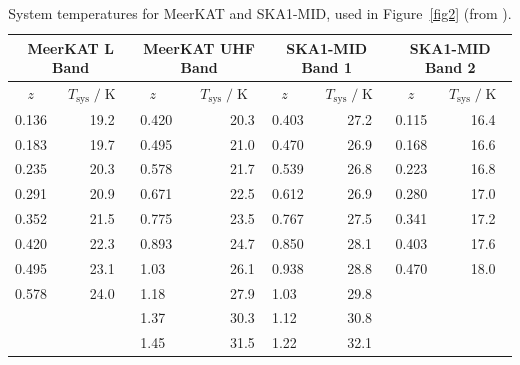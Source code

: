 \vspace*{-0.5cm}
\begin{table}[! ht]
\centering
\caption{\label{tab:skasystemp} System temperatures for MeerKAT and SKA1-MID, used in Figure~\ref{fig2} (from \cite{Fonseca:2019qek}).} 
\vspace*{0.2cm}
  \begin{tabular}{|l|l|l|l|l|l|l|l|}
    \hline
      \multicolumn{2}{|c|}{MeerKAT L Band} &
      \multicolumn{2}{c|}{MeerKAT UHF Band} &
      \multicolumn{2}{c|}{SKA1-MID Band 1} & 
      \multicolumn{2}{c|}{SKA1-MID Band 2} \\
      \hline \hline
    $~~~~z~~$ & $~~T_\mathrm{sys}\;/\;\mathrm{K}~~~$ & $~~~z~$ & $~~~~T_\mathrm{sys}\;/\;\mathrm{K}~~$ & $~~~z~$ & $~~T_\mathrm{sys}\;/\;\mathrm{K}~~$ & $~~~~z~~$ & $~~T_\mathrm{sys}\;/\;\mathrm{K}~~$ \\
    \hline
    
  
     0.136 & ~~~~19.2 & 0.420 & ~~~~~~20.3 & 0.403 & ~~~~27.2 & 0.115 & ~~~~16.4 \\
    
     0.183 & ~~~~19.7 & 0.495 & ~~~~~~21.0 & 0.470 & ~~~~26.9 & 0.168 & ~~~~16.6 \\
    
     0.235 & ~~~~20.3 & 0.578 & ~~~~~~21.7 & 0.539 & ~~~~26.8 & 0.223 & ~~~~16.8 \\
    
     0.291 & ~~~~20.9 & 0.671 & ~~~~~~22.5 & 0.612 & ~~~~26.9 & 0.280 & ~~~~17.0 \\
    
     0.352 & ~~~~21.5 & 0.775 & ~~~~~~23.5 & 0.767 & ~~~~27.5 & 0.341 & ~~~~17.2 \\
    
    0.420 & ~~~~22.3 & 0.893 & ~~~~~~24.7  & 0.850 & ~~~~28.1 & 0.403 & ~~~~17.6 \\
    
    0.495 & ~~~~23.1 & 1.03 & ~~~~~~26.1   & 0.938 & ~~~~28.8 & 0.470  & ~~~~18.0 \\
    
    0.578 & ~~~~24.0 & 1.18 & ~~~~~~27.9   & 1.03  & ~~~~29.8 &        &  \\
    
          &          & 1.37 & ~~~~~~30.3   & 1.12  & ~~~~30.8 &        &  \\
     
          &          & 1.45 & ~~~~~~31.5   & 1.22  & ~~~~32.1 &        &  \\
    

\end{tabular}
\end{table}
